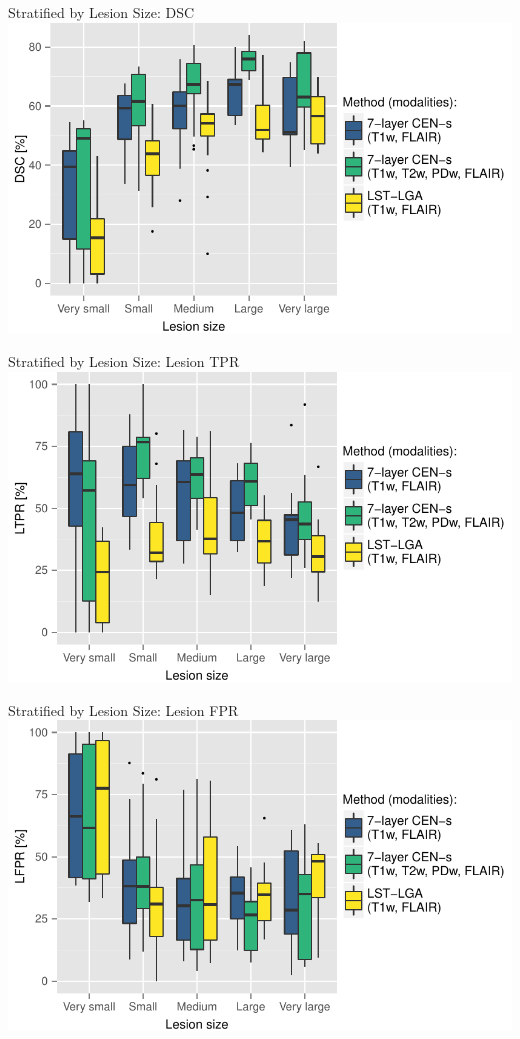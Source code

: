 \documentclass{beamer}
\begin{document}
\begin{frame}{Stratified by Lesion Size: DSC}
\includegraphics[width=1.02\textwidth]{images/dsc2}
\end{frame}

\begin{frame}{Stratified by Lesion Size: Lesion TPR}
\includegraphics[width=1.02\textwidth]{images/tpr}
\end{frame}

\begin{frame}{Stratified by Lesion Size: Lesion FPR}
\includegraphics[width=1.02\textwidth]{images/fpr}
\end{frame}
\end{document}
